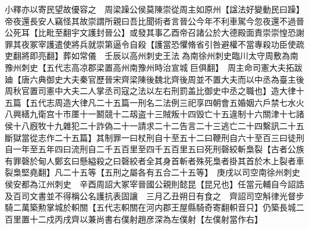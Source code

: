 小釋亦以寄民望故優容之　周梁躁公侯莫陳崇從周主如原州【諡法好變動民曰躁】帝夜還長安人竊怪其故崇謂所親曰吾比聞術者言晉公今年不利車駕今忽夜還不過晉公死耳【比毗至翻宇文護封晉公】或發其事乙酉帝召諸公於大德殿面責崇崇惶恐謝罪其夜冢宰護遣使將兵就崇第逼令自殺【護當恐懼脩省引咎避權不當專殺功臣使疏吏翻將即亮翻】葬如常儀　壬辰以高州刺史王法為南徐州刺史臨川太守周敷為南豫州刺史【五代志高凉郡梁置高州南豫州時治宣城巨俱翻】　周主命司憲大夫拓跋廸【唐六典御史大夫秦官歷晉宋齊梁陳後魏北齊後周並不置大夫而以中丞為臺主後周秋官置司憲中大夫二人掌丞司寇之法以左右刑罰盖比御史中丞之職也】造大律十五篇【五代志周造大律凡二十五篇一刑名二法例三祀享四朝會五婚姻六戶禁七水火八興繕九衛宫十市㕓十一鬭競十二刼盗十三賊叛十四毁亡十五違制十六關津十七諸侯十八廐牧十九雜犯二十詐偽二十一請求二十二告言二十三逃亡二十四繫訊二十五斷獄當從志作二十五篇】其制罪一曰杖刑自十至五十二曰鞭刑自六十至百三曰徒刑自一年至五年四曰流刑自二千五百里至四千五百里五曰死刑磬絞斬梟裂【古者公族有罪磬於甸人鄭玄曰懸縊殺之曰磬絞者全其身首斬者殊死梟者掛其首於木上裂者車裂梟堅堯翻】凡二十五等【五刑之屬各有五合二十五等】　庚戌以司空南徐州刺史侯安都為江州刺史　辛酉周詔大冢宰晉國公親則懿昆【昆兄也】任當元輔自今詔誥及百司文書並不得稱公名護抗表固讓　三月乙丑朔日有食之　齊詔司空斛律光督步騎二萬築勲掌城於軹關【五代志軹關在河内郡王屋縣騎奇寄翻軹音只】仍築長城二百里置十二戍丙戌齊以兼尚書右僕射趙彦深為左僕射【左僕射當作右】

